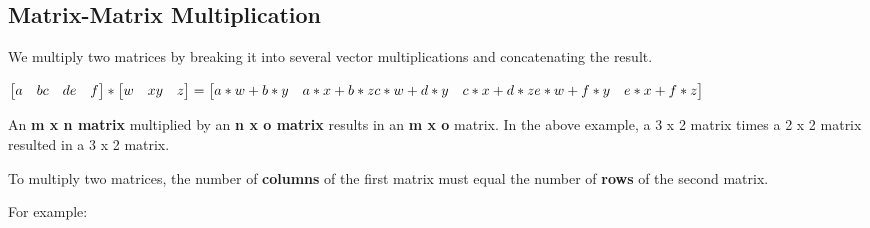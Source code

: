 \documentclass[
]{article}
\newenvironment{Shaded}{\begin{snugshade}}{\end{snugshade}}
\newcommand{\CommentTok}[1]{\textcolor[rgb]{0.56,0.35,0.01}{\textit{#1}}}
\newcommand{\FloatTok}[1]{\textcolor[rgb]{0.00,0.00,0.81}{#1}}
\newcommand{\NormalTok}[1]{#1}
\newcommand{\OperatorTok}[1]{\textcolor[rgb]{0.81,0.36,0.00}{\textbf{#1}}}
\begin{document}
\hypertarget{matrix-matrix-multiplication}{%
\subsection{Matrix-Matrix
Multiplication}\label{matrix-matrix-multiplication}}

We multiply two matrices by breaking it into several vector
multiplications and concatenating the result.

\(\begin{bmatrix} a & b \newline c & d \newline e & f \end{bmatrix} *\begin{bmatrix} w & x \newline y & z \newline \end{bmatrix} =\begin{bmatrix} a*w + b*y & a*x + b*z \newline c*w + d*y & c*x + d*z \newline e*w + f*y & e*x + f*z\end{bmatrix}\)

An \textbf{m x n matrix} multiplied by an \textbf{n x o matrix} results
in an \textbf{m x o} matrix. In the above example, a 3 x 2 matrix times
a 2 x 2 matrix resulted in a 3 x 2 matrix.

To multiply two matrices, the number of \textbf{columns} of the first
matrix must equal the number of \textbf{rows} of the second matrix.

For example:

\begin{Shaded}
\end{Shaded}
\end{document}
